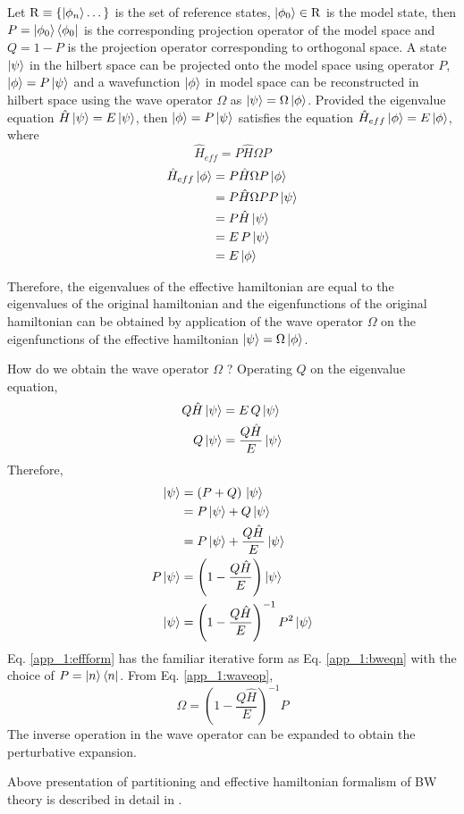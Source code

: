 Let $\mathrm{R}\equiv\{\ket{\phi_n}\dots\}$ is the set of reference states, $\ket{\phi_0} \in \mathrm{R}$ is the model state, 
then $P = \ket{\phi_0}\bra{\phi_0}$ is the corresponding projection operator of the model space and $Q = \mathrm{1} - P$ is the
projection operator corresponding to orthogonal space. A state $\ket{\psi}$ in the hilbert space can be projected onto the model 
space using operator $P$, $\ket{\phi} = P\ket{\psi}$ and a wavefunction $\ket{\phi}$ in model space can be reconstructed in hilbert
space using the wave operator $\Omega$ as $\ket{\psi} = \Omega\ket{\phi}$. Provided the eigenvalue equation
$\hat{H}\ket{\psi} = E\ket{\psi}$, then $\ket{\phi} = P\ket{\psi}$ satisfies the equation 
$\hat{H}_{eff}\ket{\phi} = E\ket{\phi}$, where 
\begin{equation}
  \hat{H}_{eff} = P\hat{H}\Omega P
\end{equation}
\begin{align*}
 \hat{H}_{eff}\ket{\phi} &= P\hat{H}\Omega P \ket{\phi} \\
 &= P\hat{H}\Omega P P\ket{\psi} \\
 &= P\hat{H}\ket{\psi} \\
 &= E\,P\ket{\psi} \\
 &= E\ket{\phi}
\end{align*}

Therefore, the eigenvalues of the effective hamiltonian are equal to the eigenvalues of the original hamiltonian and the 
eigenfunctions of the original hamiltonian can be obtained by application of the wave operator $\Omega$ on the eigenfunctions of
the effective hamiltonian $\ket{\psi} = \Omega\ket{\phi}$.

How do we obtain the wave operator $\Omega$ ? Operating $Q$ on the eigenvalue equation,
\begin{align*}
 Q\hat{H}\ket{\psi} &= E\,Q\ket{\psi} \\
 Q\ket{\psi} &= \frac{Q\hat{H}}{E}\ket{\psi}
\end{align*}
Therefore,
\begin{align}
  \ket{\psi} &= (P + Q)\,\ket{\psi} \nonumber \\
  &= P\ket{\psi} + Q\ket{\psi} \nonumber \\
  \label{app_1:effform} &= P\ket{\psi} + \frac{Q\hat{H}}{E}\ket{\psi} \\
  P\ket{\psi} &= \left(1-\frac{Q\hat{H}}{E}\right)\ket{\psi} \nonumber \\
  \label{app_1:waveop} \ket{\psi} &= \left(1-\frac{Q\hat{H}}{E}\right)^{-1} P^2 \ket{\psi}  
\end{align} Eq. \eqref{app_1:effform} has the familiar iterative form as Eq. \eqref{app_1:bweqn} with the choice of 
$P = \ket{n}\bra{n}$. From Eq. \eqref{app_1:waveop}, 
\begin{equation}
 \Omega = \left(1-\frac{Q\hat{H}}{E}\right)^{-1}P
\end{equation}
The inverse operation in the wave operator can be expanded to obtain the perturbative expansion.

Above presentation of partitioning and effective hamiltonian formalism of BW theory is described in 
detail in \parencite{wilson2009brillouin}.